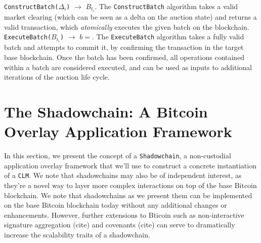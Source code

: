 \documentclass[10pt,a4paper]{article}
\theoremstyle{definition}
\begin{document}
\texttt{ConstructBatch($\Delta_i$)} $\rightarrow$ $B_{t_i}$. The
\texttt{ConstructBatch} algorithm takes a valid market clearing (which can be
seen as a delta on the auction state) and returns a valid transaction, which
\emph{atomically} executes the given batch on the blockchain. \\

\texttt{ExecuteBatch($B_{t_i}$)} $\rightarrow$ $b=$. The \texttt{ExecuteBatch}
algorithm takes a fully valid batch and attempts to commit it, by confirming
the transaction in the target base blockchain. Once the batch has been
confirmed, all operations contained within a batch are considered executed, and
can be used as inputs to additional iterations of the auction life cycle.




\iffalse
shadow chain section: 
  * define as state machine that returns tate, then later define state in specific section to the the input of all the utxos and other state 
  
 ShadowChain:
    * Init() -> lambda params, w/e w/e 
    * state = InitState(auctioneerUtxo)
    * state = stateStep(state, stateDelta) -- a qurom needed to state step, 
    * propose set of updates to all 
        * for account := range accounts {
            proopse state 
         }
     * state_i = UpgradeState(state_i) 
     * state = {operatorKey, k_1, .., k_n}
     * state = stateFunc(state, proposal, executionEnv)
          * env can change off-chain, no need to on-chain upgrades, identified by hash/identifier 
     * order of execution func as way to impl soft-forks?  
     * state = coasalce(state_,1, ..., state_n) (transaction cut thru)
     * quorum = propose(masterKey, accounts) 
     * ^ then state func 
\fi

\section{The Shadowchain: A Bitcoin Overlay Application Framework}

In this section, we present the concept of a \texttt{Shadowchain}, a
non-custodial application overlay framework that we'll use to construct a
concrete instantiation of a \texttt{CLM}. We note that shadowchains may also be
of independent interest, as they're a novel way to layer more complex
interactions on top of the base Bitcoin blockchain. We note that shadowchains
as we present them can be implemented on the base Bitcoin blockchain today
without any additional changes or enhancements. However, further extensions to
Bticoin such as non-interactive signature aggregation (cite) and covenants
(cite) can serve to dramatically increase the scalability traits of a
shadowchain.
\end{document}

